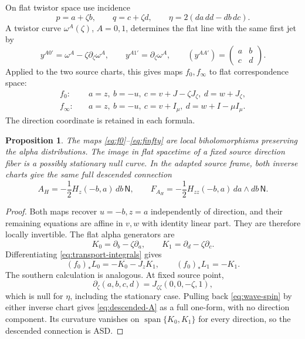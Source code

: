 \documentclass[11pt]{article}
\numberwithin{equation}{section}
\newtheorem{proposition}[theorem]{Proposition}
\theoremstyle{definition}
\theoremstyle{remark}
\newcommand{\Span}{\operatorname{span}}
\newcommand{\NN}{\mathsf N}
\begin{document}
On flat twistor space use incidence
\begin{equation}\label{eq:flat-incidence}
p=a+\zeta b,\qquad q=c+\zeta d,
\qquad \eta=2(da\,dd-db\,dc).
\end{equation}
A twistor curve $\omega^A(\zeta)$, $A=0,1$, determines the flat line with the same first jet by
\begin{equation}\label{eq:tangent-line}
y^{A0'}=\omega^A-\zeta\partial_\zeta\omega^A,
\qquad y^{A1'}=\partial_\zeta\omega^A,
\qquad (y^{AA'})=\begin{pmatrix}a&b\\c&d\end{pmatrix}.
\end{equation}
Applied to the two source charts, this gives maps $f_0,f_\infty$ to flat correspondence space:
\begin{align}
f_0:\quad &a=z,\ b=-u,\ c=v+J-\zeta J_\zeta,\ d=w+J_\zeta,
\label{eq:f0}\\
f_\infty:\quad &a=z,\ b=-u,\ c=v+I_\mu,\ d=w+I-\mu I_\mu.
\label{eq:finfty}
\end{align}
The direction coordinate is retained in each formula.

\begin{proposition}\label{prop:wave-charts}
The maps \eqref{eq:f0}--\eqref{eq:finfty} are local biholomorphisms preserving the alpha distributions. The image in flat spacetime of a fixed source direction fiber is a possibly stationary null curve. In the adapted source frame, both inverse charts give the same full descended connection
\begin{equation}\label{eq:descended-A}
A_H=-\frac12H_z(-b,a)\,db\,\NN,
\qquad
F_{A_H}=-\frac12H_{zz}(-b,a)\,da\wedge db\,\NN.
\end{equation}
\end{proposition}
\begin{proof}
Both maps recover $u=-b,z=a$ independently of direction, and their remaining equations are affine in $v,w$ with identity linear part. They are therefore locally invertible. The flat alpha generators are
\[
K_0=\partial_b-\zeta\partial_a,
\qquad K_1=\partial_d-\zeta\partial_c.
\]
Differentiating \eqref{eq:transport-integrals} gives
\[
(f_0)_*L_0=-K_0-J_zK_1,
\qquad (f_0)_*L_1=-K_1.
\]
The southern calculation is analogous. At fixed source point,
\[
\partial_\zeta(a,b,c,d)=J_{\zeta\zeta}(0,0,-\zeta,1),
\]
which is null for $\eta$, including the stationary case. Pulling back \eqref{eq:wave-spin} by either inverse chart gives \eqref{eq:descended-A} as a full one-form, with no direction component. Its curvature vanishes on $\Span\{K_0,K_1\}$ for every direction, so the descended connection is ASD.
\end{proof}
\end{document}
